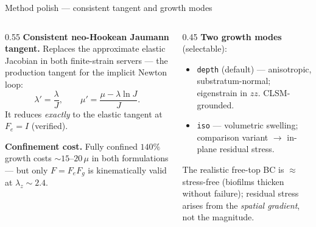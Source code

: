 \documentclass[aspectratio=169,xcolor=dvipsnames]{beamer}
\begin{document}
\begin{frame}{Method polish — consistent tangent and growth modes}
\begin{columns}[T]
\begin{column}{0.55\textwidth}
\textbf{Consistent neo-Hookean Jaumann tangent.} Replaces the approximate elastic Jacobian in both
finite-strain servers — the production tangent for the implicit Newton loop:
\[
\lambda' = \frac{\lambda}{J},\qquad \mu' = \frac{\mu-\lambda\ln J}{J}.
\]
It reduces \emph{exactly} to the elastic tangent at $F_e=I$ (verified).
\vspace{0.5em}

\textbf{Confinement cost.} Fully confined $140\%$ growth costs $\sim 15$--$20\,\mu$ in both
formulations — but only $F=F_e F_g$ is kinematically valid at $\lambda_z\!\sim\!2.4$.
\end{column}
\begin{column}{0.45\textwidth}
\textbf{Two growth modes} (selectable):
\begin{itemize}
  \item \texttt{depth} (default) — anisotropic, substratum-normal; eigenstrain in $zz$.
    CLSM-grounded.
  \item \texttt{iso} — volumetric swelling; comparison variant $\to$ in-plane residual stress.
\end{itemize}
\vspace{0.5em}
\footnotesize The realistic free-top BC is $\approx$ stress-free (biofilms thicken without failure);
residual stress arises from the \emph{spatial gradient}, not the magnitude.
\end{column}
\end{columns}
\end{frame}
\end{document}
